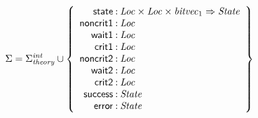\documentclass[a4paper]{article}
\def\lthtmlcheckvsize{\ifdim\ht\sizebox<\vsize 
  \ifdim\wd\sizebox<\hsize\expandafter\hfill\fi \expandafter\vfill
  \else\expandafter\vss\fi}%
\begin{document}
{\newpage\clearpage
{}%
$\displaystyle \Sigma = 
\Sigma^{\mathit{int}}_{\mathit{theory}}\cup\left\{
\begin{array}{r@{\>}c@{\>}l}
\mathsf{state} & : & \mathit{Loc} \times \mathit{Loc} \times \mathit{bitvec}_{1} \Rightarrow \mathit{State}\\
\mathsf{noncrit1} & : & \mathit{Loc}\\
\mathsf{wait1} & : & \mathit{Loc}\\
\mathsf{crit1} & : & \mathit{Loc}\\
\mathsf{noncrit2} & : & \mathit{Loc}\\
\mathsf{wait2} & : & \mathit{Loc}\\
\mathsf{crit2} & : & \mathit{Loc}\\
\mathsf{success} & : & \mathit{State}\\
\mathsf{error} & : & \mathit{State}\\
\end{array}
\right\}
$%
\lthtmlindisplaymathZ
\lthtmlcheckvsize\clearpage}
\end{document}
